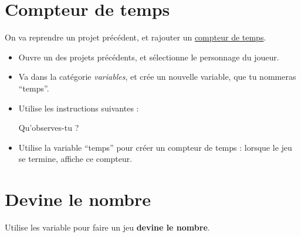 \documentclass[a4paper,12pt]{article}
\begin{document}
\maketitle

\section*{Compteur de temps}

On va reprendre un projet précédent, et rajouter un \uline{compteur de temps}.

\begin{itemize}
	\item Ouvre un des projets précédents, et sélectionne le personnage du joueur.
	\item Va dans la catégorie \textit{variables}, et crée un nouvelle variable, que tu nommeras “temps”.
	\item Utilise les instructions suivantes :

	      \begin{center}
	      \end{center}


	      Qu'observes-tu ? \dotfill
	\item Utilise la variable “temps” pour créer un compteur de temps : lorsque le jeu se termine, affiche ce compteur.
\end{itemize}

\section*{Devine le nombre}

Utilise les variable pour faire un jeu \textbf{devine le nombre}.
\end{document}
